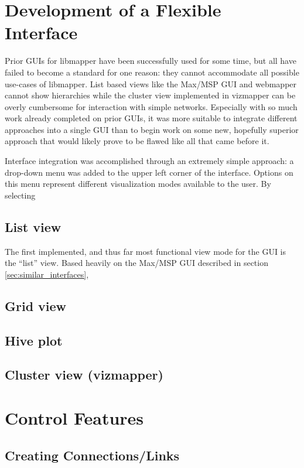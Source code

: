 \section{Development of a Flexible Interface}
	
Prior GUIs for libmapper have been successfully used for some time, but all have failed to become a standard for one reason: they cannot accommodate all possible use-cases of libmapper. List based views like the Max/MSP GUI and webmapper cannot show hierarchies while the cluster view implemented in vizmapper can be overly cumbersome for interaction with simple networks. Especially with so much work already completed on prior GUIs, it was more suitable to integrate different approaches into a single GUI than to begin work on some new, hopefully superior approach that would likely prove to be flawed like all that came before it. 

Interface integration was accomplished through an extremely simple approach: a drop-down menu was added to the upper left corner of the interface. Options on this menu represent different visualization modes available to the user. By selecting 

\subsection{List view}
\label{sec:list_view}

The first implemented, and thus far most functional view mode for the GUI is the ``list'' view. Based heavily on the Max/MSP GUI described in section \ref{sec:similar_interfaces}, 

\subsection{Grid view}
\subsection{Hive plot}
\subsection{Cluster view (vizmapper)}

\section{Control Features}
\subsection{Creating Connections/Links}

